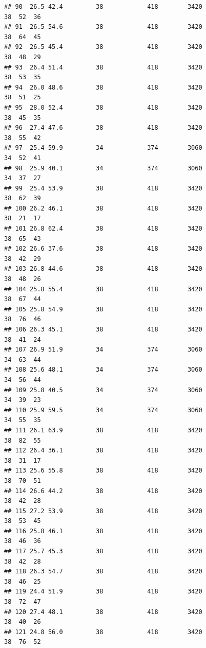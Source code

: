 \documentclass[
]{book}
\theoremstyle{definition}
\theoremstyle{definition}
\theoremstyle{definition}
\theoremstyle{definition}
\theoremstyle{remark}
\begin{document}
\begin{verbatim}
## 90  26.5 42.4         38            418        3420                  38  52  36
## 91  26.5 54.6         38            418        3420                  38  64  45
## 92  26.5 45.4         38            418        3420                  38  48  29
## 93  26.4 51.4         38            418        3420                  38  53  35
## 94  26.0 48.6         38            418        3420                  38  51  25
## 95  28.0 52.4         38            418        3420                  38  45  35
## 96  27.4 47.6         38            418        3420                  38  55  42
## 97  25.4 59.9         34            374        3060                  34  52  41
## 98  25.9 40.1         34            374        3060                  34  37  27
## 99  25.4 53.9         38            418        3420                  38  62  39
## 100 26.2 46.1         38            418        3420                  38  21  17
## 101 26.8 62.4         38            418        3420                  38  65  43
## 102 26.6 37.6         38            418        3420                  38  42  29
## 103 26.8 44.6         38            418        3420                  38  48  26
## 104 25.8 55.4         38            418        3420                  38  67  44
## 105 25.8 54.9         38            418        3420                  38  76  46
## 106 26.3 45.1         38            418        3420                  38  41  24
## 107 26.9 51.9         34            374        3060                  34  63  44
## 108 25.6 48.1         34            374        3060                  34  56  44
## 109 25.8 40.5         34            374        3060                  34  39  23
## 110 25.9 59.5         34            374        3060                  34  55  35
## 111 26.1 63.9         38            418        3420                  38  82  55
## 112 26.4 36.1         38            418        3420                  38  31  17
## 113 25.6 55.8         38            418        3420                  38  70  51
## 114 26.6 44.2         38            418        3420                  38  42  28
## 115 27.2 53.9         38            418        3420                  38  53  45
## 116 25.8 46.1         38            418        3420                  38  46  36
## 117 25.7 45.3         38            418        3420                  38  42  28
## 118 26.3 54.7         38            418        3420                  38  46  25
## 119 24.4 51.9         38            418        3420                  38  72  47
## 120 27.4 48.1         38            418        3420                  38  40  26
## 121 24.8 56.0         38            418        3420                  38  76  52

\end{verbatim}
\end{document}
